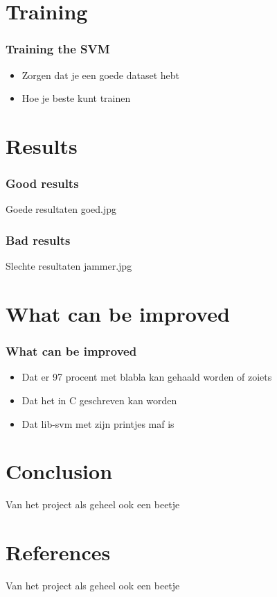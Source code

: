\documentclass{beamer}
\begin{document}
  \section{Training}

  \begin{frame}
    \frametitle{Training the SVM}
    \begin{itemize}
      \item Zorgen dat je een goede dataset hebt
      \pause
      \item Hoe je beste kunt trainen
    \end{itemize}
  \end{frame}

  \section{Results}

  \begin{frame}
    \frametitle{Good results}
    Goede resultaten goed.jpg
  \end{frame}

  \begin{frame}
    \frametitle{Bad results}
    Slechte resultaten jammer.jpg
  \end{frame}


  \section{What can be improved}

  \begin{frame}
    \frametitle{What can be improved}
    \begin{itemize}
      \item Dat er 97 procent met blabla kan gehaald worden of zoiets
      \pause
      \item Dat het in C geschreven kan worden
      \pause
      \item Dat lib-svm met zijn printjes maf is
    \end{itemize}
  \end{frame}

  \section{Conclusion} 
    \begin{frame}
      Van het project als geheel ook een beetje
    \end{frame}

  \section{References}
	  \begin{frame}
      Van het project als geheel ook een beetje
    \end{frame}
\end{document}
